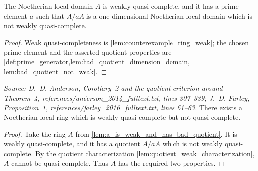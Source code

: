 \begin{lemma}
  \label{lem:a_is_weak_and_has_bad_quotient}
  The Noetherian local domain \(A\) is weakly quasi-complete, and it has a
  prime element \(a\) such that \(A/aA\) is a one-dimensional Noetherian
  local domain which is not weakly quasi-complete.
\end{lemma}

\begin{proof}
  Weak quasi-completeness is \cref{lem:counterexample_ring_weak}; the chosen
  prime element and the asserted quotient properties are
  \cref{def:prime_generator,lem:bad_quotient_dimension_domain,
  lem:bad_quotient_not_weak}.
\end{proof}

\begin{theorem}
  \label{thm:main}
  \textit{Source: D.~D. Anderson, Corollary~2 and the quotient criterion
  around Theorem~4, references/anderson\_2014\_fulltext.txt, lines 307--339;
  J.~D. Farley, Proposition~1,
  references/farley\_2016\_fulltext.txt, lines 61--63.}
  There exists a Noetherian local ring which is weakly quasi-complete but not
  quasi-complete.
\end{theorem}

\begin{proof}
  Take the ring \(A\) from
  \cref{lem:a_is_weak_and_has_bad_quotient}.  It is weakly quasi-complete, and
  it has a quotient \(A/aA\) which is not weakly quasi-complete.  By the
  quotient characterization \cref{lem:quotient_weak_characterization}, \(A\)
  cannot be quasi-complete.  Thus \(A\) has the required two properties.
\end{proof}
